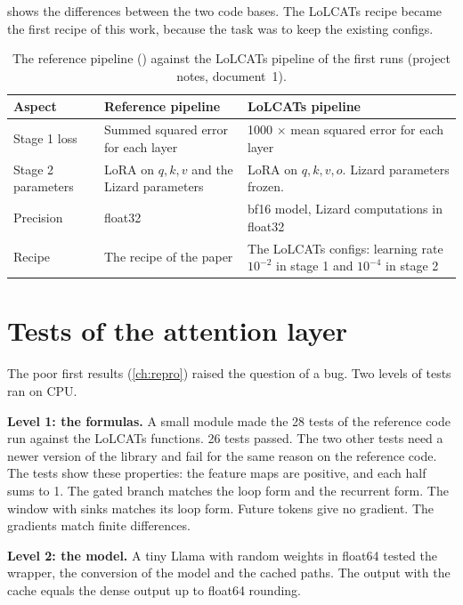 shows the differences between the two code bases. The LoLCATs recipe became the first recipe of this work, because the task was to keep the existing configs.

\begin{table}[ht]
\centering
\small
\caption[The reference pipeline against the LoLCATs pipeline]{The reference pipeline () against the LoLCATs pipeline of the first runs (project notes, document~1).}
\label{tab:jku-vs-lolcats}
\begin{tabularx}{\linewidth}{@{}lLL@{}}
\toprule
Aspect & Reference pipeline & LoLCATs pipeline \\
\midrule
Stage 1 loss & Summed squared error for each layer & 1000 $\times$ mean squared error for each layer \\
Stage 2 parameters & LoRA on $q, k, v$ and the Lizard parameters & LoRA on $q, k, v, o$. Lizard parameters frozen. \\
Precision & float32 & bf16 model, Lizard computations in float32 \\
Recipe & The recipe of the paper & The LoLCATs configs: learning rate $10^{-2}$ in stage 1 and $10^{-4}$ in stage 2 \\
\bottomrule
\end{tabularx}
\end{table}

\section{Tests of the attention layer}
\label{sec:tests}

The poor first results (\cref{ch:repro}) raised the question of a bug. Two levels of tests ran on CPU.

\textbf{Level 1: the formulas.} A small module made the 28 tests of the reference code run against the LoLCATs functions. 26 tests passed. The two other tests need a newer version of the  library and fail for the same reason on the reference code. The tests show these properties: the feature maps are positive, and each half sums to 1. The gated branch matches the loop form and the recurrent form. The window with sinks matches its loop form. Future tokens give no gradient. The gradients match finite differences.

\textbf{Level 2: the model.} A tiny Llama with random weights in float64 tested the wrapper, the conversion of the model and the cached paths. The output with the cache equals the dense output up to float64 rounding.

